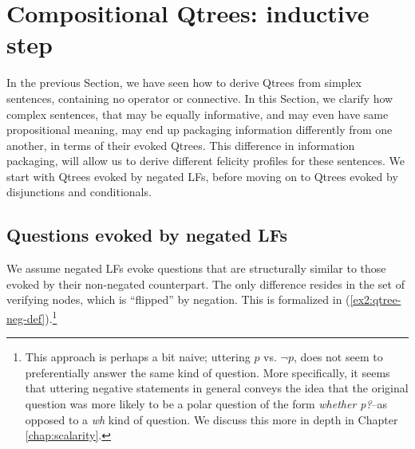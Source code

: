 \section{Compositional Qtrees: inductive step}

In the previous Section, we have seen how to derive Qtrees from simplex sentences, containing no operator or connective. In this Section, we clarify how complex sentences, that may be equally informative, and may even have same propositional meaning, may end up packaging information differently from one another, in terms of their evoked Qtrees. This difference in information packaging, will allow us to derive different felicity profiles for these sentences. We start with Qtrees evoked by negated LFs, before moving on to Qtrees evoked by disjunctions and conditionals.

\subsection{Questions evoked by negated LFs}\label{sec:neg}
We assume negated LFs evoke questions that are structurally similar to those evoked by their non-negated counterpart. The only difference resides in the set of verifying nodes, which is ``flipped'' by negation. This is formalized in (\ref{ex2:qtree-neg-def}).\footnote{This approach is perhaps a bit naive; uttering $p$ vs. $\neg p$, does not seem to preferentially answer the same kind of question. More specifically, it seems that uttering negative statements in general conveys the idea that the original question was more likely to be a polar question of the form \textit{whether p?}--as opposed to a \textit{wh} kind of question. We discuss this more in depth in Chapter \ref{chap:scalarity}.}

\begin{exe}
	\label{ex2:qtree-neg-def}
\end{exe}

